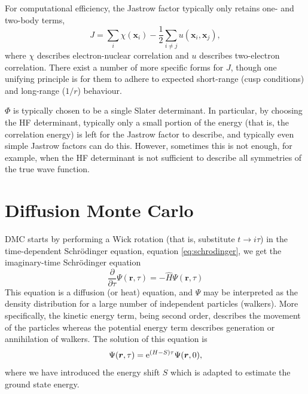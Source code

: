 For computational efficiency, the Jastrow factor typically only retains one- and two-body terms,\supercite{foulkesQuantum}
\begin{equation}
    J = \sum_i \chi(\bm x_i) - \frac 12 \sum_{i\neq j} u(\bm x_i, \bm x_j),
\end{equation}
where $\chi$ describes electron-nuclear correlation and $u$ describes two-electron correlation. There exist a number of more specific forms for $J$,\supercite{lopezriosFrameworkConstructingGeneric2012} though one unifying principle is for them to adhere to expected short-range (cusp conditions) and long-range ($1/r$) behaviour.

$\Phi$ is typically chosen to be a single Slater determinant.\supercite{foulkesQuantum,fahyVariational1988,liCohesive1991,rajagopalQuantum1994,malatestaVariational1997}
In particular, by choosing the \gls{HF} determinant, typically only a small portion of the energy (that is, the correlation energy) is left for the Jastrow factor to describe, and typically even simple Jastrow factors can do this.\supercite{foulkesQuantum}
However, sometimes this is not enough, for example, when the HF determinant is not sufficient to describe all symmetries of the true wave function.\supercite{harrisonQuantum1985,lesterRecent1997,umrigarDiffusion1993}

\section{Diffusion Monte Carlo}
\Gls{DMC} starts by performing a Wick rotation (that is, substitute $t\to i\tau$) in the time-dependent Schr\"odinger equation, equation \ref{eq:schrodinger}, we get the imaginary-time Schr\"odinger equation
\begin{equation}
    \label{eq:imag_time_schrodinger}
    \frac{\partial}{\partial\tau}\Psi(\bm r, \tau) = -\hat H \Psi(\bm r, \tau)
\end{equation}
This equation is a diffusion (or heat) equation, and $\Psi$ may be interpreted as the density distribution for a large number of independent particles (walkers).\supercite{fickLiquid1995}
More specifically, the kinetic energy term, being second order, describes the movement of the particles whereas the potential energy term describes generation or annihilation of walkers. The solution of this equation is
\begin{equation}
    \Psi(\bm r, \tau) = \mathrm{e}^{(H-S)\tau}\Psi(\bm r, 0),
\end{equation}
where we have introduced the energy shift $S$ which is adapted to estimate the ground state energy.\supercite{kosztinIntroduction1996}

